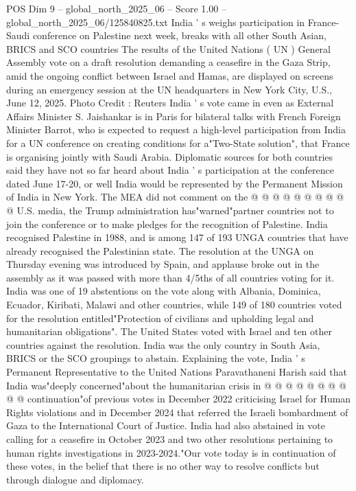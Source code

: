 \begin{textsample}{POS Dim 9 – global\_north\_2025\_06 – Score 1.00 – global\_north\_2025\_06/125840825.txt}  \label{ex:f9_pos_374}
India ' s weighs participation in France-Saudi conference on Palestine next week, breaks with all other South Asian, BRICS and SCO countries The results of the United Nations ( UN ) General Assembly vote on a draft resolution demanding a ceasefire in the Gaza Strip, amid the ongoing conflict between Israel and Hamas, are displayed on screens during an emergency session at the UN headquarters in New York City, U.S., June 12, 2025.
Photo Credit : Reuters India ' s vote came in even as External Affairs Minister S.
Jaishankar is in Paris for bilateral talks with French Foreign Minister Barrot, who is expected to request a high-level participation from India for a UN conference on creating conditions for a"Two-State solution", that France is organising jointly with Saudi Arabia.
Diplomatic sources for both countries said they have not so far heard about India ' s participation at the conference dated June 17-20, or well India would be represented by the Permanent Mission of India in New York.
The MEA did not comment on the @ @ @ @ @ @ @ @ @ @ U.S. media, the Trump administration has"warned"partner countries not to join the conference or to make pledges for the recognition of Palestine.
India recognised Palestine in 1988, and is among 147 of 193 UNGA countries that have already recognised the Palestinian state.
The resolution at the UNGA on Thursday evening was introduced by Spain, and applause broke out in the assembly as it was passed with more than 4/5ths of all countries voting for it.
India was one of 19 abstentions on the vote along with Albania, Dominica, Ecuador, Kiribati, Malawi and other countries, while 149 of 180 countries voted for the resolution entitled"Protection of civilians and upholding legal and humanitarian obligations".
The United States voted with Israel and ten other countries against the resolution.
India was the only country in South Asia, BRICS or the SCO groupings to abstain.
Explaining the vote, India ' s Permanent Representative to the United Nations Paravathaneni Harish said that India was"deeply concerned"about the humanitarian crisis in @ @ @ @ @ @ @ @ @ @ continuation"of previous votes in December 2022 criticising Israel for Human Rights violations and in December 2024 that referred the Israeli bombardment of Gaza to the International Court of Justice.
India had also abstained in vote calling for a ceasefire in October 2023 and two other resolutions pertaining to human rights investigations in 2023-2024."Our vote today is in continuation of these votes, in the belief that there is no other way to resolve conflicts but through dialogue and diplomacy.

\end{textsample}
